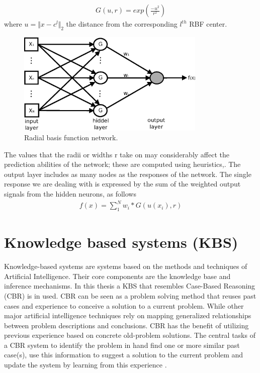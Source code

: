 \begin{eqnarray}
	G(u,r)=exp(\frac{-u^2}{r^2})
\end{eqnarray}  
where $u=\Vert x-c^l \Vert_2$ the distance from the corresponding $l^{th}$ RBF center.

\begin{figure}[h!]
\centering
\includegraphics[width=90mm]{RBF.eps} 
\caption{Radial basis function network.}
\label{rbf1}
\end{figure}
The values that the radii or widths r take on may considerably affect the prediction abilities of the network; these are computed using heuristics,\cite{Haykin}. The output layer includes as many nodes as the responses of the network. The single response we are dealing with is expressed by the sum of the weighted output signals from the hidden neurons, as follows             
\begin{eqnarray}
	f(x)=\sum _1^N w_i*G(u(x_i),r)
\end{eqnarray}  



\section{Knowledge based systems (KBS)}
Knowledge-based systems are systems based on the methods and techniques 
of Artificial Intelligence. Their core components are the knowledge base and 
inference mechanisms. In this thesis a KBS that resembles Case-Based Reasoning (CBR) is in used.
CBR can be seen as a problem solving method that 
reuses past cases and experience to conceive a solution to a current problem. 
While other major artificial intelligence techniques rely on mapping generalized 
relationships between problem descriptions and conclusions. CBR has the benefit 
of utilizing previous experience based on concrete old-problem solutions. 
The central tasks of a CBR system to identify the problem in hand find one or 
more similar past case(s), use this information to suggest a solution to the current 
problem and update the system by learning from this experience \cite{kolodner_1991,kolodner_1993,slade_1991,riesbeck_1989}.      

